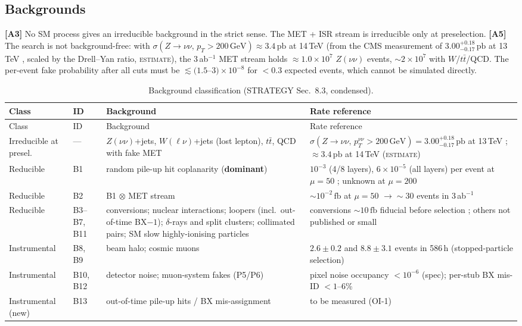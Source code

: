 \documentclass[11pt,a4paper]{article}
\newcommand{\EST}{\textsc{estimate}}
\newcommand{\GeV}{\,\mathrm{GeV}}
\newcommand{\fb}{\,\mathrm{fb}}
\newcommand{\pb}{\,\mathrm{pb}}
\newcommand{\lab}[1]{\textbf{[#1]}}
\begin{document}
\subsection{Backgrounds}
\lab{A3} No SM process gives an irreducible background in the strict sense. The MET + ISR stream is irreducible only at preselection. \lab{A5} The search is not background-free: with $\sigma(Z\to\nu\nu,\,p_T>200\GeV)\approx3.4\pb$ at 14\,TeV (from the CMS measurement of $3.00^{+0.18}_{-0.17}\pb$ at 13\,TeV \cite{Zinv}, scaled by the Drell--Yan ratio, \EST), the 3\,ab$^{-1}$ MET stream holds $\approx1.0\times10^7$ $Z(\nu\nu)$ events, $\sim2\times10^7$ with $W$/$t\bar t$/QCD. The per-event fake probability after all cuts must be $\lesssim(1.5$--$3)\times10^{-8}$ for $<0.3$ expected events, which cannot be simulated directly.

{\small
\begin{longtable}{@{}L{2.26cm}L{0.82cm}L{4.51cm}L{8.51cm}@{}}
\caption{Background classification (STRATEGY Sec.~8.3, condensed).}\label{tab:bkg}\\
\toprule Class & ID & Background & Rate reference\\\midrule\endfirsthead
\toprule Class & ID & Background & Rate reference\\\midrule\endhead
\bottomrule\endfoot
Irreducible at presel. & --- & $Z(\nu\nu)$+jets, $W(\ell\nu)$+jets (lost lepton), $t\bar t$, QCD with fake MET & $\sigma(Z\to\nu\nu,\,p_T^{\nu\nu}>200\GeV)=3.00^{+0.18}_{-0.17}\pb$ at 13\,TeV \cite{Zinv}; $\approx3.4\pb$ at 14\,TeV (\EST)\\
Reducible & B1 & random pile-up hit coplanarity (\textbf{dominant}) & $10^{-3}$ (4/8 layers), $6\times10^{-5}$ (all layers) per event at $\mu=50$ \cite{Knapen}; unknown at $\mu=200$\\
Reducible & B2 & B1 $\otimes$ MET stream & $\sim10^{-2}\fb$ at $\mu=50$ $\to\sim30$ events in 3\,ab$^{-1}$ \cite{LiLi}\\
Reducible & B3--B7, B11 & conversions; nuclear interactions; loopers (incl.\ out-of-time BX$-1$); $\delta$-rays and split clusters; collimated pairs; SM slow highly-ionising particles & conversions $\sim10\fb$ fiducial before selection \cite{Knapen}; others not published or small\\
Instrumental & B8, B9 & beam halo; cosmic muons & $2.6\pm0.2$ and $8.8\pm3.1$ events in 586\,h (stopped-particle selection) \cite{stopped}\\
Instrumental & B10, B12 & detector noise; muon-system fakes (P5/P6) & pixel noise occupancy $<10^{-6}$ (spec); per-stub BX mis-ID $<1$--6\% \cite{L1DS}\\
Instrumental (new) & B13 & out-of-time pile-up hits / BX mis-assignment & to be measured (OI-1)\\
\end{longtable}
}
\end{document}
